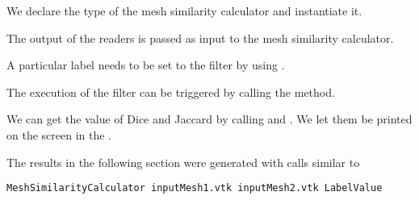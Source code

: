 \documentclass{InsightArticle}
\begin{document}
\begin{center}

\end{center}

We declare the type of the mesh similarity calculator and instantiate it.

\begin{center}

\end{center}

The output of the readers is passed as input to the mesh similarity calculator.

\begin{center}

\end{center}

A particular label needs to be set to the filter by using .

\begin{center}

\end{center}

The execution of the filter can be triggered by calling the  method.

\begin{center}

\end{center}

We can get the value of Dice and Jaccard by calling  and 
. We let them be printed on the screen in the .

\begin{center}

\end{center}

The results in the following section were generated with calls similar to

\begin{verbatim}
MeshSimilarityCalculator inputMesh1.vtk inputMesh2.vtk LabelValue 
\end{verbatim}


\clearpage


%
%



\end{document}
